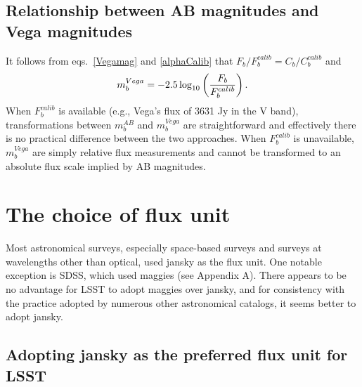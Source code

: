 \documentclass[PST,toc]{lsstdoc}
\begin{document}
\subsection{Relationship between AB magnitudes and Vega magnitudes}

It follows from eqs.~\ref{Vegamag} and \ref{alphaCalib} that
$F_b/F^{calib}_{b} = C_b / C_b^{calib}$ and
\begin{equation}
\label{VegamagAB}
               m^{Vega}_b = -2.5\log_{10}\left({F_b \over F^{calib}_{b}}\right).
\end{equation}
When $F^{calib}_{b}$ is available (e.g., Vega's flux of 3631 Jy in the V band), transformations between
$m^{AB}_b$ and $m^{Vega}_b$ are straightforward and effectively there is no practical difference
between the two approaches. When $F^{calib}_{b}$ is unavailable, $m^{Vega}_b$ are simply relative flux measurements
and cannot be transformed to an absolute flux scale implied by AB magnitudes.


\section{The choice of flux unit}

Most astronomical surveys, especially space-based surveys and surveys
at wavelengths other than optical, used jansky as the flux unit.  One notable
exception is SDSS, which used maggies (see Appendix A). There appears to be
no advantage for LSST to adopt maggies over jansky, and for consistency
with the practice adopted by numerous other astronomical catalogs, it seems
better to adopt jansky.


\subsection{Adopting jansky as the preferred flux unit for LSST  \label{sec:Jy}}
\end{document}
